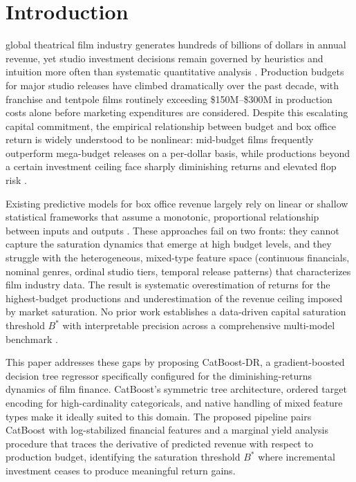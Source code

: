 \documentclass[journal]{IEEEtran}
\begin{document}
\IEEEpeerreviewmaketitle


\section{Introduction}

 global theatrical film industry generates hundreds of billions of dollars in annual revenue, yet studio investment decisions remain governed by heuristics and intuition more often than systematic quantitative analysis \cite{smith2025filmrisk}. Production budgets for major studio releases have climbed dramatically over the past decade, with franchise and tentpole films routinely exceeding \$150M–\$300M in production costs alone before marketing expenditures are considered. Despite this escalating capital commitment, the empirical relationship between budget and box office return is widely understood to be nonlinear: mid-budget films frequently outperform mega-budget releases on a per-dollar basis, while productions beyond a certain investment ceiling face sharply diminishing returns and elevated flop risk \cite{chen2025boxoffice}.

Existing predictive models for box office revenue largely rely on linear or shallow statistical frameworks that assume a monotonic, proportional relationship between inputs and outputs \cite{li2025entertainmentML}. These approaches fail on two fronts: they cannot capture the saturation dynamics that emerge at high budget levels, and they struggle with the heterogeneous, mixed-type feature space (continuous financials, nominal genres, ordinal studio tiers, temporal release patterns) that characterizes film industry data. The result is systematic overestimation of returns for the highest-budget productions and underestimation of the revenue ceiling imposed by market saturation. No prior work establishes a data-driven capital saturation threshold \(B^*\) with interpretable precision across a comprehensive multi-model benchmark \cite{wang2025tabularbench}.

This paper addresses these gaps by proposing CatBoost-DR, a gradient-boosted decision tree regressor specifically configured for the diminishing-returns dynamics of film finance. CatBoost's symmetric tree architecture, ordered target encoding for high-cardinality categoricals, and native handling of mixed feature types make it ideally suited to this domain. The proposed pipeline pairs CatBoost with log-stabilized financial features and a marginal yield analysis procedure that traces the derivative of predicted revenue with respect to production budget, identifying the saturation threshold \(B^*\) where incremental investment ceases to produce meaningful return gains.
\end{document}
